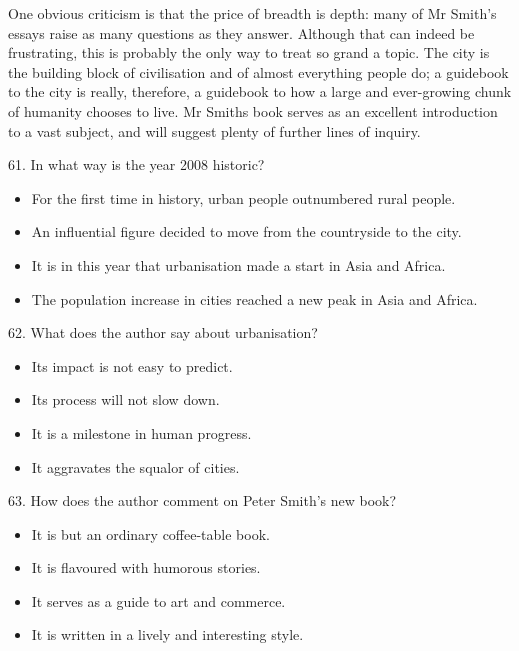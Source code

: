 \documentclass[UTF8,11pt]{ctexart}
\begin{document}
One obvious criticism is that the price of breadth is depth: many of Mr Smith’s essays raise as many questions as they answer. Although that can indeed be frustrating, this is probably the only way to treat so grand a topic. The city is the building block of civilisation and of almost everything people do; a guidebook to the city is really, therefore, a guidebook to how a large and ever-growing chunk of humanity chooses to live. Mr Smiths book serves as an excellent introduction to a vast subject, and will suggest plenty of further lines of inquiry.


61. In what way is the year 2008 historic?


\begin{itemize}[leftmargin=2em,itemsep=.2em,topsep=.4em]\item[A.] For the first time in history, urban people outnumbered rural people.
\item[B.] An influential figure decided to move from the countryside to the city.
\item[C.] It is in this year that urbanisation made a start in Asia and Africa.
\item[D.] The population increase in cities reached a new peak in Asia and Africa.
\end{itemize}

62. What does the author say about urbanisation?


\begin{itemize}[leftmargin=2em,itemsep=.2em,topsep=.4em]\item[A.] Its impact is not easy to predict.
\item[B.] Its process will not slow down.
\item[C.] It is a milestone in human progress.
\item[D.] It aggravates the squalor of cities.
\end{itemize}

63. How does the author comment on Peter Smith’s new book?


\begin{itemize}[leftmargin=2em,itemsep=.2em,topsep=.4em]\item[A.] It is but an ordinary coffee-table book.
\item[B.] It is flavoured with humorous stories.
\item[C.] It serves as a guide to art and commerce.
\item[D.] It is written in a lively and interesting style.
\end{itemize}
\end{document}
